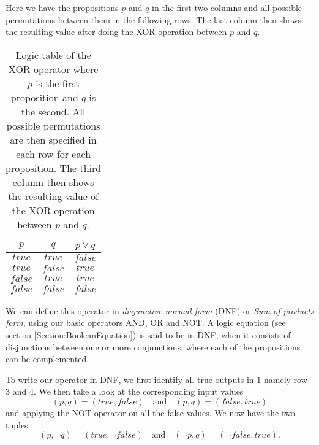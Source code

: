                 Here we have the propositions $p$ and $q$ in the first two columns and all possible permutations between them in the following rows. The last column then shows the resulting value after doing the XOR operation between $p$ and $q$.
                
                \begin{table}[h!]
                    \centering
                    \begin{tabular}{|c|c|c|}
                    	\hline
                    	  $p$   &   $q$   & $p \veebar q$ \\ \hline
                    	$true$  & $true$  &    $false$    \\ \hline
                    	$true$  & $false$ &    $true$     \\ \hline
                    	$false$ & $true$  &    $true$     \\ \hline
                    	$false$ & $false$ &    $false$    \\ \hline
                    \end{tabular}
                    \caption{Logic table of the XOR operator where $p$ is the first proposition and $q$ is the second. All possible permutations are then specified in each row for each proposition. The third column then shows the resulting value of the XOR operation between $p$ and $q$.}
                    \label{LogicTable:XOR}
                \end{table}
            
                We can define this operator in \textit{disjunctive normal form} (DNF) or \textit{Sum of products form}, using our basic operators AND, OR and NOT. A logic equation (see section \ref{Section:BooleanEquation}) is said to be in DNF, when it consists of disjunctions between one or more conjunctions, where each of the propositions can be complemented.
                
                To write our operator in DNF, we first identify all true outputs in \ref{LogicTable:XOR} namely row 3 and 4. We then take a look at the corresponding input values
                \begin{equation}
                    (p,q) = (true, false) \quad \text{and} \quad (p,q) = (false, true)
                \end{equation}
                and applying the NOT operator on all the false values. We now have the two tuples
                \begin{equation}
                    (p,\neg q) = (true, \neg false) \quad \text{and} \quad (\neg p, q) = (\neg false, true).
                \end{equation}
                
